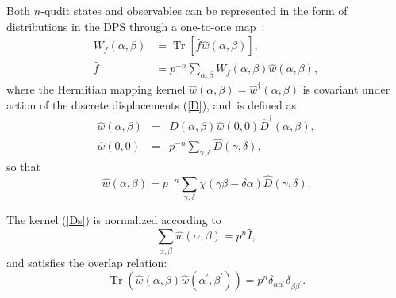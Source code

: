 \documentclass[quantumrep,article,accept,pdftex,moreauthors]{Definitions/mdpi}
\DeclareMathOperator{\Tr}{Tr}
\begin{document}
Both $n$-qudit states and observables can be represented in the form of
distributions in the DPS through a one-to-one map~\cite{gross,DFW2-1,DFW2-2,DFW2-3,DFW2-4}:
\begin{align}
  W_{f}\left( \alpha,\beta \right)
  &= \Tr\left[ \hat{f}\hat{w}\left( \alpha,\beta \right) \right],
  \label{map} \\
  \hat{f}
  &= p^{-n}\sum_{\alpha,\beta } W_{f}(\alpha,\beta) \hat{w}(\alpha,\beta),
\end{align}
where the Hermitian mapping kernel $\hat{w}\left( \alpha,\beta \right) =
\hat{w}^{\dagger}(\alpha,\beta)$ is covariant under action of the discrete
displacements (\ref{D}), and~is defined as
\begin{eqnarray}
  \hat{w}\left( \alpha,\beta \right)
  &=& \hat{D}\left( \alpha,\beta \right) 
  \hat{w}\left( 0,0\right) \hat{D}^{\dagger}\left( \alpha,\beta \right) ,
  \label{Ds} \\
  \hat{w}\left( 0,0\right)
  &=& p^{-n} \sum_{\gamma,\delta}\hat{D}(\gamma,\delta),
  \label{Dw0}
\end{eqnarray}
so that
\begin{equation}
  \hat{w} \left( \alpha,\beta \right)
  = p^{-n} \sum_{\gamma,\delta}
  \chi(\gamma\beta-\delta\alpha) \hat{D}(\gamma,\delta).
  \label{wabD}
\end{equation}

The kernel (\ref{Ds}) is normalized according to
\begin{equation}
  \sum_{\alpha,\beta}\hat{w}\left(\alpha,\beta\right)
  = p^{n}\hat{I},
\end{equation}
and satisfies the overlap relation:
\begin{equation}
  \Tr\left(\hat{w}(\alpha,\beta)\hat{w}(\alpha^{\prime},\beta^{\prime})\right)
  = p^{n} \delta_{\alpha \alpha^{\prime}} \delta_{\beta\beta^{\prime}}.
\end{equation}
\end{document}
